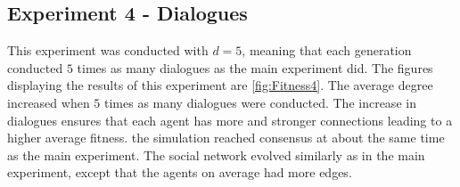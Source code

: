 \subsection{Experiment 4 - Dialogues}
This experiment was conducted with $d = 5$, meaning that each generation conducted $5$ times as many dialogues as the main experiment did. The figures displaying the results of this experiment are \ref{fig:Fitness4}. The average degree increased when $5$ times as many dialogues were conducted. The increase in dialogues ensures that each agent has more and stronger connections leading to a higher average fitness. the simulation reached consensus at about the same time as the main experiment. The social network evolved similarly as in the main experiment, except that the agents on average had more edges.
\begin{figure}[htbp]
    \centering
    \hfill
    \par \bigskip

\end{figure}
